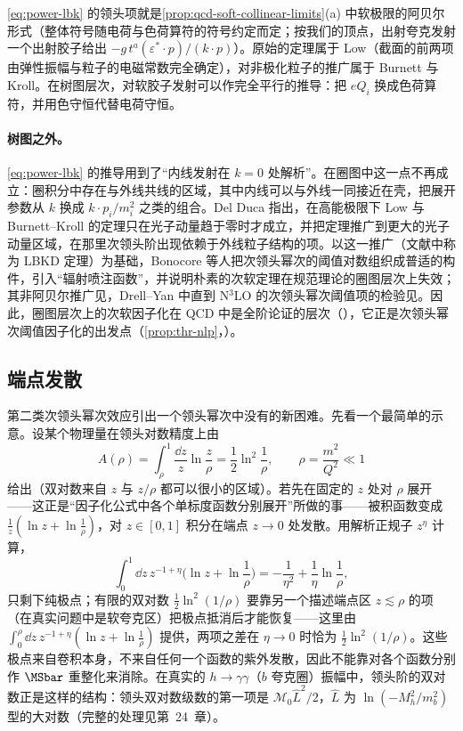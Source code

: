 \eqref{eq:power-lbk} 的领头项就是\cref{prop:qcd-soft-collinear-limits}(a) 中软极限的阿贝尔形式（整体符号随电荷与色荷算符的符号约定而定；按我们的顶点，出射夸克发射一个出射胶子给出 $-g\,t^a(\varepsilon^*\!\cdot p)/(k\cdot p)$）。原始的定理属于 Low\cite{Low1958}（截面的前两项由弹性振幅与粒子的电磁常数完全确定），对非极化粒子的推广属于 Burnett 与 Kroll\cite{BurnettKroll1968}。在树图层次，对软胶子发射可以作完全平行的推导：把 $eQ_i$ 换成色荷算符，并用色守恒代替电荷守恒。

\paragraph{树图之外。}
\eqref{eq:power-lbk} 的推导用到了“内线发射在 $k=0$ 处解析”。在圈图中这一点不再成立：圈积分中存在与外线共线的区域，其中内线可以与外线一同接近在壳，把展开参数从 $k$ 换成 $k\cdot p_i/m_i^2$ 之类的组合。Del Duca 指出，在高能极限下 Low 与 Burnett--Kroll 的定理只在光子动量趋于零时才成立，并把定理推广到更大的光子动量区域，在那里次领头阶出现依赖于外线粒子结构的项\cite{DelDuca1990}。以这一推广（文献中称为 LBKD 定理）为基础，Bonocore 等人把次领头幂次的阈值对数组织成普适的构件，引入“辐射喷注函数”，并说明朴素的次软定理在规范理论的圈图层次上失效\cite{Bonocore:2015esa}；其非阿贝尔推广见\cite{Bonocore:2016awd}，Drell--Yan 中直到 N$^3$LO 的次领头幂次阈值项的检验见\cite{Bahjat-Abbas:2018hpv}。因此，圈图层次上的次软因子化在 QCD 中是全阶论证的层次（\tagA），它正是次领头幂次阈值因子化的出发点（\cref{prop:thr-nlp}，\tagP）。

\subsection{端点发散}

第二类次领头幂次效应引出一个领头幂次中没有的新困难。先看一个最简单的示意。设某个物理量在领头对数精度上由
\begin{equation}\label{eq:power-endpoint-toy}
A(\rho)=\int_\rho^1\frac{\dd z}{z}\ln\frac{z}{\rho}=\frac12\ln^2\frac1\rho,\qquad\rho=\frac{m^2}{Q^2}\ll1
\end{equation}
给出（双对数来自 $z$ 与 $z/\rho$ 都可以很小的区域）。若先在固定的 $z$ 处对 $\rho$ 展开——这正是“因子化公式中各个单标度函数分别展开”所做的事——被积函数变成 $\frac1z(\ln z+\ln\frac1\rho)$，对 $z\in[0,1]$ 积分在端点 $z\to0$ 处发散。用解析正规子 $z^\eta$ 计算，
\begin{equation*}
\int_0^1\!\dd z\,z^{-1+\eta}\Big(\ln z+\ln\frac1\rho\Big)=-\frac{1}{\eta^2}+\frac{1}{\eta}\ln\frac1\rho ,
\end{equation*}
只剩下纯极点；有限的双对数 $\frac12\ln^2(1/\rho)$ 要靠另一个描述端点区 $z\lesssim\rho$ 的项（在真实问题中是软夸克区）把极点抵消后才能恢复——这里由 $\int_0^\rho\dd z\,z^{-1+\eta}(\ln z+\ln\frac1\rho)$ 提供，两项之差在 $\eta\to0$ 时恰为 $\frac12\ln^2(1/\rho)$。这些极点来自卷积本身，不来自任何一个函数的紫外发散，因此不能靠对各个函数分别作 $\MSbar$ 重整化来消除。在真实的 $h\to\gamma\gamma$（$b$ 夸克圈）振幅中，领头阶的双对数正是这样的结构：领头双对数级数的第一项是 $\mathcal M_0\hat L^2/2$，$\hat L$ 为 $\ln(-M_h^2/m_b^2)$ 型的大对数（完整的处理见第~24~章）。%

